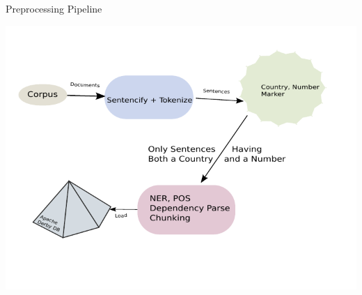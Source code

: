 \documentclass{beamer}
\begin{document}
\begin{frame}{Preprocessing Pipeline}
 \begin{center}
 \includegraphics{./imgs/pipeline.pdf}
\end{center}

\end{frame}
\end{document}
